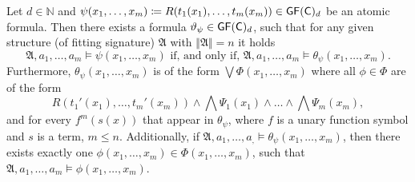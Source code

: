 \begin{lemma}
	Let $d\in\mathbb N$ and $\psi(x_1,\dots,x_m)\coloneqq R(t_1(x_1),\dots,t_m(x_m))\in \mathsf{GF}(\mathsf{C})_d$ be an atomic formula.
	Then there exists a formula $\vartheta_\psi\in\mathsf{GF}(\mathsf{C})_d$, such that for any given structure (of fitting signature) $\mathfrak A$ with $\Vert\mathfrak A \Vert=n$ it holds
	$$\mathfrak A,a_1,\dots,a_m\models \psi(x_1,\dots,x_m) \text{ if, and only if, } \mathfrak A,a_1,\dots,a_m\models \theta_\psi(x_1,\dots,x_m).$$
	Furthermore, $\theta_\psi(x_1,\dots,x_m)$ is of the form $\bigvee \Phi(x_1,\dots,x_m)$ where all $\phi\in\Phi$ are of the form
	$$R(t_1'(x_1),\dots,t_m'(x_m))\land \bigwedge\Psi_1(x_1)\land \dots\land\bigwedge \Psi_m(x_m),$$
	and for every $f^m(s(x))$ that appear in $\theta_\psi$, where $f$ is a unary function symbol and $s$ is a term, $m\leq n$.
	Additionally, if $\mathfrak A,a_1,\dots,a_,\models \theta_\psi(x_1,\dots,x_m)$, then there exists exactly one $\phi(x_1,\dots,x_m)\in\Phi(x_1,\dots,x_m)$, such that $\mathfrak A,a_1,\dots,a_m\models \phi(x_1,\dots,x_m)$.
	\label{TranslationOfArbAtomics}
\end{lemma}
